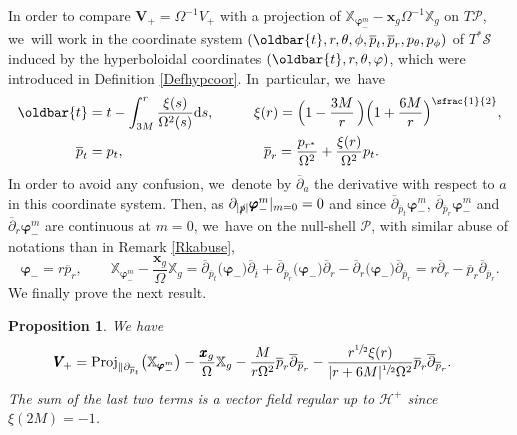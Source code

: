 \documentclass[10pt]{amsart}
\let\bar\oldbar
\theoremstyle{plain}
\newtheorem{proposition}{Proposition}[section]
\theoremstyle{definition}
\newcommand\T{{\mathbb{X}}}
\renewcommand\H{{\mathcal{H}^+}}
\newcommand\dr{{\mathrm{d}}}
\begin{document}
In order to compare $\pmb{V}_{\!+}=\Omega^{-1}V_+$ with a projection of $\T_{\pmb{\varphi}_-^m}-\pmb{x}_g \Omega^{-1} \T_g$ on $T \mathcal{P}$, we~will work in the coordinate system $(\bar{t},r,\theta, \phi, \overline{p}_t, \overline{p}_r, p_\theta, p_\phi)$ of $T^*\mathcal{S}$ induced by the hyperboloidal coordinates $(\bar{t},r,\theta, \varphi)$, which were introduced in Definition \ref{Defhypcoor}. In~particular, we~have
\begin{alignat*}{2}
\bar{t} & = t-\int_{3M}^r \frac{\xi(s)}{\Omega^2(s)} \dr s, \qquad &&\xi(r)=\Bigl(1-\frac{3M}{r} \, \Bigr) \Bigl(1+\frac{6M}{r} \Bigr)^{\sfrac{1}{2}}, \\
\overline{p}_t&=p_t, \qquad && \; \; \, \overline{p}_r=\frac{p_{r^*}}{\Omega^2}+\frac{\xi(r)}{ \Omega^2}p_t.
\end{alignat*}
In order to avoid any confusion, we~denote by $\overline{\partial}_a$ the derivative with respect to $a$ in this coordinate system. Then, as $ \partial_{|\slashed{p}|} \pmb{\varphi}_-^m\vert_{m=0}=0$ and since $\overline{\partial}_{\overline{p}_t} \pmb{\varphi}_-^m$, $ \overline{\partial}_{\overline{p}_r} \pmb{\varphi}_-^m$ and $ \overline{\partial}_r \pmb{\varphi}_-^m$ are continuous at $m=0$, we~have on the null-shell $\mathcal{P}$, with similar abuse of notations than in Remark \ref{Rkabuse},
\[
\pmb{\varphi}_-=r \overline{p}_r,\qquad \T_{\pmb{\varphi}_-^m}-\frac{\pmb{x}_g}{\Omega} \T_g= \overline{\partial}_{\overline{p}_t} \bigl(\pmb{\varphi}_- \bigr)\overline{\partial}_{\overline{t}}+\overline{\partial}_{\overline{p}_r} \bigl(\pmb{\varphi}_- \bigr) \overline{\partial}_{r}-\overline{\partial}_{r}\bigl(\pmb{\varphi}_- \bigr) \overline{\partial}_{\overline{p}_r}=r\overline{\partial}_r-\overline{p}_r \overline{\partial}_{\overline{p}_r}.
\]
We finally prove the next result.
\begin{proposition}\label{ProprojrescVplus}
We have
\begin{align*}
\pmb{V}_{\! +} & = \mathrm{Proj}_{\parallel \partial_{\overline{p}_t}} \bigl(\T_{\pmb{\varphi}_-^m} \bigr)-\frac{\pmb{x}_g}{\Omega} \T_g - \frac{M }{r \Omega^2} \overline{p}_r \overline{\partial}_{\overline{p}_r}-\frac{r^{\sfrac{1}{2}}\xi(r)}{|r+6M|^{\sfrac{1}{2}}\Omega^2} \overline{p}_r \overline{\partial}_{\overline{p}_r}.
\end{align*}
The sum of the last two terms is a vector field regular up to $\H$ since $\xi(2M)=-1$.
\end{proposition}
\end{document}
